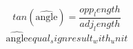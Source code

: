 \[tan(\widehat{{\text{{{angle}}}}})=\frac{{{opp_length}}}{{{adj_length}}}\]
\[\widehat{{\text{{{angle}}}}}{equal_sign}{result_with_unit}\]
